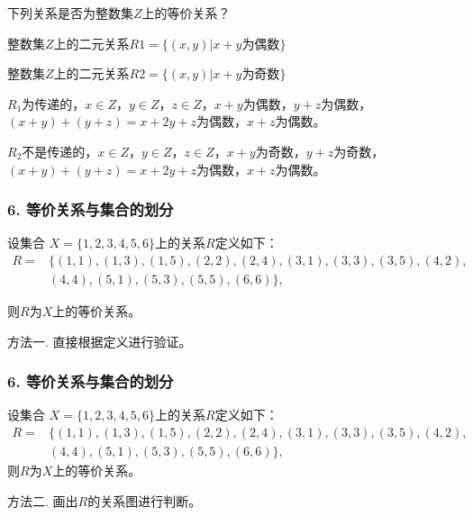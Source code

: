 \documentclass{beamer}
\begin{document}
\begin{CJK*}{UTF8}{gbsn}
\begin{frame}
  下列关系是否为整数集$Z$上的等价关系？

  整数集$Z$上的二元关系$R1=\{(x,y)|x+y$为偶数$\}$

  整数集$Z$上的二元关系$R2=\{(x,y)|x+y$为奇数$\}$

  $R_1$为传递的，$x\in Z$，$y\in Z$，$z\in Z$，$x+y$为偶数，\pause$y+z$为偶数，
  $(x+y)+(y+z)=x+2y+z$为偶数，$x+z$为偶数。

  $R_2$不是传递的，$x\in Z$，$y\in Z$，$z\in Z$，$x+y$为奇数，\pause$y+z$为奇数，
  $(x+y)+(y+z)=x+2y+z$为偶数，$x+z$为偶数。

\end{frame}
\begin{frame}
  \frametitle{6. 等价关系与集合的划分}
  \begin{Ex}
    设集合
    $X=\{1,2,3,4,5,6 \}$上的关系$R$定义如下：
    \begin{align*}
      R=&\{(1,1),(1,3),(1,5),(2,2),(2,4),(3,1),(3,3),(3,5),(4,2),\\
      &(4,4),(5,1),(5,3),(5,5),(6,6)\},
    \end{align*}
  \end{Ex}
  则$R$为$X$上的等价关系。  

  \pause 方法一. 直接根据定义进行验证。
\end{frame}

\begin{frame}
  \frametitle{6. 等价关系与集合的划分}
    设集合
    $X=\{1,2,3,4,5,6 \}$上的关系$R$定义如下：
    \begin{align*}
      R=&\{(1,1),(1,3),(1,5),(2,2),(2,4),(3,1),(3,3),(3,5),(4,2),\\
      &(4,4),(5,1),(5,3),(5,5),(6,6)\},
    \end{align*}
  则$R$为$X$上的等价关系。  

  \pause 方法二. 画出$R$的关系图进行判断。

  \pause
\end{frame}
\end{CJK*}
\end{document}
